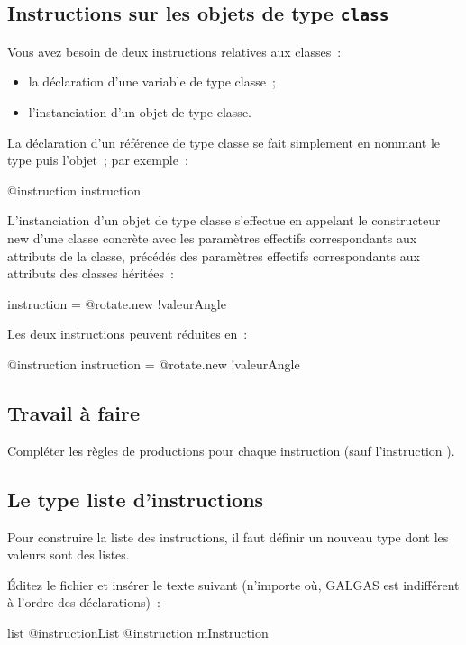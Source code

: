 \subsection{Instructions sur les objets de type \texttt{class}}

Vous avez besoin de deux instructions relatives aux classes~:
\begin{itemize}
  \item la déclaration d'une variable de type classe~;
  \item l'instanciation d'un objet de type classe.
\end{itemize}

La déclaration d'un référence de type classe se fait simplement en nommant le type puis l'objet~; par exemple~:
\begin{galgas4}
@instruction instruction
\end{galgas4}

L'instanciation d'un objet de type classe s'effectue en appelant le constructeur new d'une classe concrète avec les paramètres effectifs correspondants aux attributs de la classe, précédés des paramètres effectifs correspondants aux attributs des classes héritées~:
\begin{galgas4}
instruction = @rotate.new {!valeurAngle}
\end{galgas4}

Les deux instructions peuvent réduites en~:
\begin{galgas4}
@instruction instruction = @rotate.new {!valeurAngle}
\end{galgas4}

\subsection{Travail à faire}
Compléter les règles de productions pour chaque instruction (sauf l'instruction ).

\subsection{Le type liste d'instructions}
Pour construire la liste des instructions, il faut définir un nouveau type dont les valeurs sont des listes.

Éditez le fichier  et insérer le texte suivant (n’importe où, GALGAS est indifférent à l’ordre des déclarations)~:

\begin{galgas4}
list @instructionList {
  @instruction mInstruction
}
\end{galgas4}

